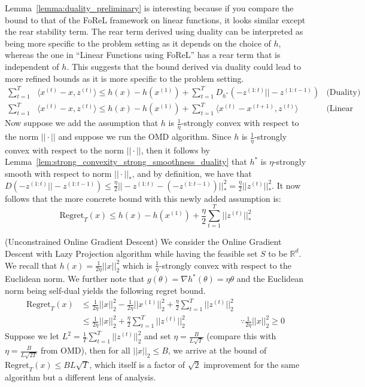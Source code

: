 Lemma~\ref{lemma:duality_preliminary} is interesting because if you compare the bound to that of the FoReL framework on linear functions, it looks similar except the rear stability term. The rear term derived using duality can be interpreted as being more specific to the problem setting as it depends on the choice of $h$, whereas the one in ``Linear Functions using FoReL'' has a rear term that is independent of $h$. This suggests that the bound derived via duality could lead to more refined bounds as it is more specific to the problem setting.
\begin{align*}
    \sum_{t=1}^T &\langle x^{(t)}- x, z^{(t)}\rangle \leq h(x)  -h(x^{(1)}) + \sum_{t=1}^T D_{h^*}(-z^{(1:t)}|| -z^{(1:t-1)}) &\text{(Duality)}\\
    \sum_{t=1}^T &\langle x^{(t)}- x, z^{(t)}\rangle \leq h(x)  -h(x^{(1)}) + \sum_{t=1}^T \langle x^{(t)} - x^{(t+1)}, z^{(t)}\rangle &\text{(Linear Functions using FoReL)}
\end{align*}
Now suppose we add the assumption that $h$ is $\frac{1}{\eta}$-strongly convex with respect to the norm $||\cdot||$ and suppose we run the OMD algorithm. Since $h$ is $\frac{1}{\eta}$-strongly convex with respect to the norm $||\cdot||$, then it follows by Lemma~\ref{lem:strong_convexity_strong_smoothness_duality} that $h^*$ is $\eta$-strongly smooth with respect to norm $||\cdot||_*$, and by definition, we have that $D(-z^{(1:t)}||-z^{(1:t-1)}) \leq \frac{\eta}{2}||-z^{(1:t)}-(-z^{(1:t-1)})||^2_* = \frac{\eta}{2}||z^{(t)}||_*^2$. It now follows that the more concrete bound with this newly added assumption is:
\begin{equation}
    \boxed{\text{Regret}_T(x) \leq h(x) - h(x^{(1)}) + \frac{\eta}{2}\sum_{t=1}^T ||z^{(t)}||_*^2}
\end{equation} 

\begin{example}{(Unconstrained Online Gradient Descent)}\label{example1}
We consider the Online Gradient Descent with Lazy Projection algorithm while having the feasible set $S$ to be $\mathbb{R}^d$. We recall that $h(x) = \frac{1}{2\eta}||x||_2^2$ which is $\frac{1}{\eta}$-strongly convex with respect to the Euclidean norm. We further note that $g(\theta) = \nabla h^*(\theta) = \eta\theta$ and the Euclidean norm being self-dual yields the following regret bound.
\begin{align}
    \text{Regret}_T(x) &\leq \frac{1}{2\eta}||x||_2^2 - \frac{1}{2\eta}||x^{(1)}||_2^2 + \frac{\eta}{2}\sum_{t=1}^T ||z^{(t)}||_2^2\\
    &\leq \frac{1}{2\eta}||x||_2^2  + \frac{\eta}{2}\sum_{t=1}^T ||z^{(t)}||_2^2 &\because \frac{1}{2\eta}||x||_2^2 \geq 0
\end{align}
Suppose we let $L^2 = \frac{1}{T}\sum_{t=1}^T||z^{(t)}||_2^2$ and set $\eta = \frac{B}{L\sqrt{T}}$ (compare this with $\eta = \frac{B}{L\sqrt{2T}}$ from OMD), then for all $||x||_2 \leq B$, we arrive at the bound of $\text{Regret}_T(x) \leq BL\sqrt{T}$, which itself is a factor of $\sqrt{2}$ improvement for the same algorithm but a different lens of analysis.
\end{example}
